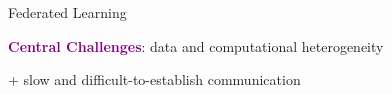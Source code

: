 \documentclass[aspectratio=169,12pt]{beamer}
\begin{document}
\begin{frame}[t]{Federated Learning}
\begin{minipage}{0.5\linewidth}
  \end{minipage}



      
  \begin{center}
      \textbf{\textcolor{purple}{Central Challenges}}: data and computational heterogeneity 

      \vspace{-0.5em}
      
      + slow and difficult-to-establish communication
  \end{center}
\end{frame}
    

      
\end{document}
